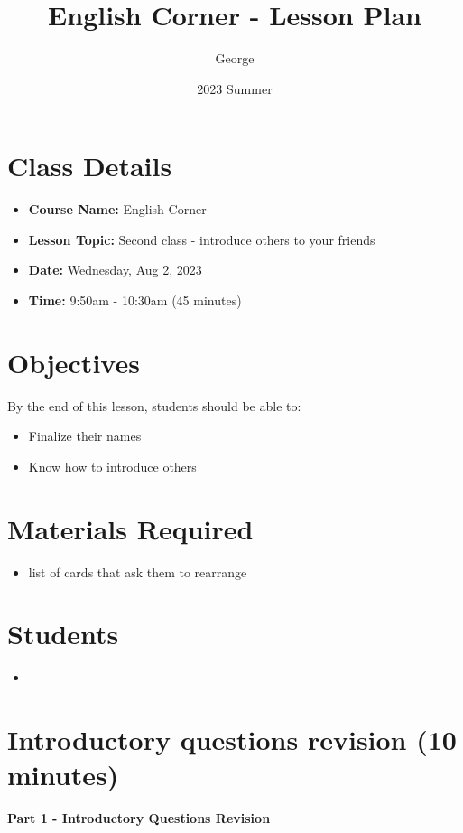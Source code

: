 \documentclass[12pt]{article}
\title{English Corner - Lesson Plan}
\author{George}
\date{2023 Summer}
\begin{document}
\maketitle

\section{Class Details}
\begin{itemize}
    \item \textbf{Course Name:} English Corner
    \item \textbf{Lesson Topic:}  Second class - introduce others to your friends 
    \item \textbf{Date:} Wednesday, Aug 2, 2023
    \item \textbf{Time:} 9:50am - 10:30am (45 minutes)
\end{itemize}

\section{Objectives}
By the end of this lesson, students should be able to:
\begin{itemize}
    \item Finalize their names
    \item Know how to introduce others

\end{itemize}

\section{Materials Required}
\begin{itemize}
   
    \item list of cards that ask them to rearrange

  
\end{itemize}


\section{Students}
\begin{itemize}
    \item 

\end{itemize}
\section*{Introductory questions revision (10 minutes)}
\noindent
\textbf{Part 1 - Introductory Questions Revision}
\end{document}
